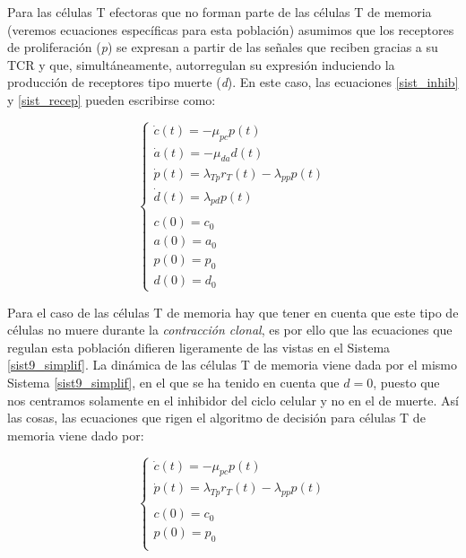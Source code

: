 Para las células T efectoras que no forman parte de las células T de memoria (veremos ecuaciones específicas para esta población) asumimos que los receptores de proliferación (\textit{p}) se expresan a partir de las señales que reciben gracias a su TCR y que, simultáneamente, autorregulan su expresión induciendo la producción de receptores tipo muerte (\textit{d}). En este caso, las ecuaciones \ref{sist_inhib} y \ref{sist_recep} pueden escribirse como:

\begin{equation}
	\label{sist9_simplif}
	\left\{ \begin{array}{l}
	\dot{c}(t) = -\mu_{pc}p(t) \\
	\dot{a}(t) = -\mu_{da}d(t)  \\
	\dot{p}(t) = \lambda_{Tp}r_{T}(t) - \lambda_{pp}p(t) \\
	\dot{d}(t) = \lambda_{pd}p(t) \\
	\\
	c(0)=c_0 \\
	a(0)=a_0 \\
	p(0)=p_0 \\
	d(0)=d_0 
	\end{array}
	\right.
\end{equation}

Para el caso de las células T de memoria hay que tener en cuenta que este tipo de células no muere durante la \textit{contracción clonal}, es por ello que las ecuaciones que regulan esta población difieren ligeramente de las vistas en el Sistema \ref{sist9_simplif}. La dinámica de las células T de memoria viene dada por el mismo Sistema \ref{sist9_simplif}, en el que se ha tenido en cuenta que $d=0$, puesto que nos centramos solamente en el inhibidor del ciclo celular y no en el de muerte. Así las cosas, las ecuaciones que rigen el algoritmo de decisión para células T de memoria viene dado por: 

\begin{equation}
	\label{sist15_simplif}
	\left\{ \begin{array}{l}
	\dot{c}(t) = -\mu_{pc}p(t) \\
	\dot{p}(t) = \lambda_{Tp}r_{T}(t) - \lambda_{pp}p(t) \\
	\\
	c(0)=c_0 \\
	p(0)=p_0 \\
	\end{array}
	\right.
\end{equation}

